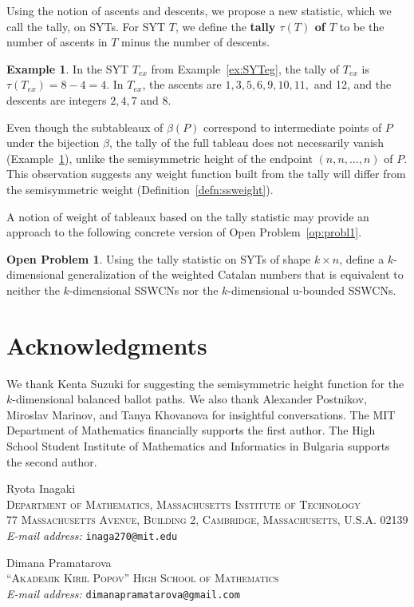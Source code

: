 \documentclass[11pt]{article}
\theoremstyle{remark}
\theoremstyle{definition}
\newtheorem{example}[theorem]{Example}
\newtheorem{openproblem}[theorem]{Open Problem}
\begin{document}
Using the notion of ascents and descents, we propose a new statistic, which we call the tally, on SYTs. For SYT $T$, we define the \textbf{tally $\tau(T)$ of $T$} to be the number of ascents in $T$ minus the number of descents. \begin{example}\label{ex:SYTtally}
In the SYT $T_{ex}$ from Example~\ref{ex:SYTeg}, the tally of $T_{ex}$ is $\tau(T_{ex}) = 8-4=4$. In $T_{ex}$, the ascents are $1, 3, 5, 6, 9, 10, 11,$ and 12, and the descents are integers $2,4, 7 $ and $8$.
\end{example}

Even though the subtableaux of $\beta(P)$ correspond to intermediate points of $P$ under the bijection $\beta$, the tally of the full tableau does not necessarily vanish (Example~\ref{ex:SYTtally}), unlike the semisymmetric height of the endpoint $(n, n, \dots, n)$ of $P$. This observation suggests any weight function built from the tally will differ from the semisymmetric weight (Definition~\ref{defn:ssweight}).

A notion of weight of tableaux based on the tally statistic may provide an approach to the following concrete version of Open Problem~\ref{op:probl1}.
\begin{openproblem}Using the tally statistic on SYTs of shape $k\times n$, define a $ k$-dimensional generalization
of the weighted Catalan numbers that is equivalent to neither the $k$-dimensional SSWCNs nor the $k$-dimensional u-bounded SSWCNs.\end{openproblem}


\section*{Acknowledgments}

We thank Kenta Suzuki for suggesting the semisymmetric height function for the $k$-dimensional balanced ballot paths. We also thank Alexander Postnikov, Miroslav Marinov, and Tanya Khovanova for insightful conversations. The MIT Department of Mathematics financially supports the first author. The High School Student Institute of Mathematics and Informatics in Bulgaria supports the second author.




\smallskip

\noindent
Ryota Inagaki \\
\textsc{
Department of Mathematics, Massachusetts Institute of Technology\\
77 Massachusetts Avenue, Building 2, Cambridge, Massachusetts, U.S.A. 02139}\\
\textit{E-mail address: }\texttt{inaga270@mit.edu}
\medskip

\noindent
Dimana Pramatarova \\
\textsc{
``Akademik Kiril Popov” High School of Mathematics }\\
\textit{E-mail address: }\texttt{dimanapramatarova@gmail.com}
\medskip
\end{document}
